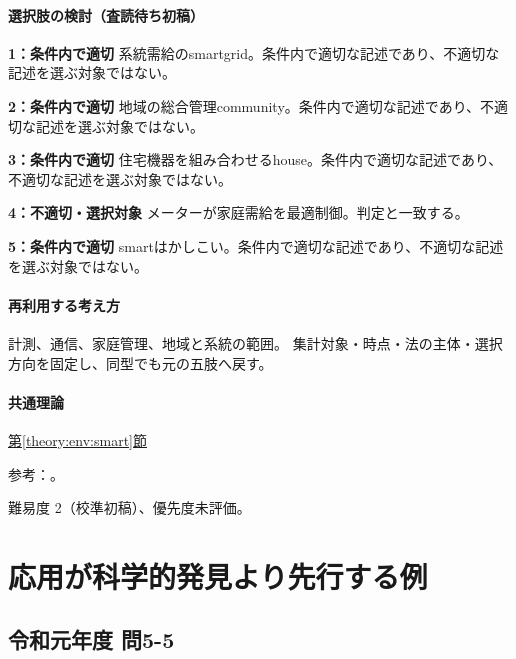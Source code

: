 \paragraph{選択肢の検討（査読待ち初稿）}\mbox{}\par

\noindent\textbf{1：条件内で適切} 系統需給のsmartgrid。条件内で適切な記述であり、不適切な記述を選ぶ対象ではない。\par

\noindent\textbf{2：条件内で適切} 地域の総合管理community。条件内で適切な記述であり、不適切な記述を選ぶ対象ではない。\par

\noindent\textbf{3：条件内で適切} 住宅機器を組み合わせるhouse。条件内で適切な記述であり、不適切な記述を選ぶ対象ではない。\par

\noindent\textbf{4：不適切・選択対象} メーターが家庭需給を最適制御。判定と一致する。\par

\noindent\textbf{5：条件内で適切} smartはかしこい。条件内で適切な記述であり、不適切な記述を選ぶ対象ではない。\par

\paragraph{再利用する考え方} 計測、通信、家庭管理、地域と系統の範囲。 集計対象・時点・法の主体・選択方向を固定し、同型でも元の五肢へ戻す。

\paragraph{共通理論} \hyperref[theory:env:smart]{第\ref*{theory:env:smart}節}

\par 参考：\cite{env59_smart}。

\par 難易度 2（校準初稿）、優先度未評価。

\section{応用が科学的発見より先行する例}

\subsection{令和元年度 問5-5}
\label{q:r01-reg-basic-5-5}

